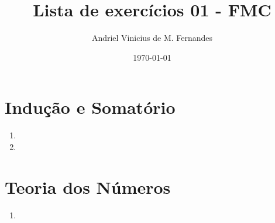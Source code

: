 \documentclass[12pt]{article}
\title{Lista de exercícios 01 - FMC}
\author{Andriel Vinicius de M. Fernandes}
\date{\today}
\begin{document}
	\maketitle
	\section{Indução e Somatório}
	\begin{enumerate}
		\item 
		\item 
	\end{enumerate}
	\section{Teoria dos Números}
	\begin{enumerate}
		\item 
	\end{enumerate}
\end{document}
